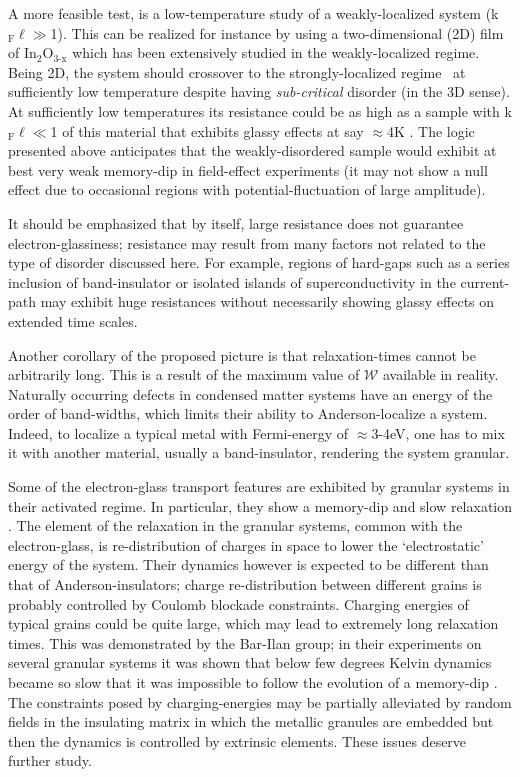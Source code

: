 \documentclass
[preprint,showpacs,byrevtex,10pt,twocolumn,tightenlines,prl,letterpaper]{revtex4}%
\begin{document}
A more feasible test, is a low-temperature study of a weakly-localized system
(k$_{\text{F}}\ell\gg$1). This can be realized for instance by using a
two-dimensional (2D) film of In$_{\text{2}}$O$_{\text{3-x}}$ which has been
extensively studied in the weakly-localized regime. Being 2D, the system
should crossover to the strongly-localized regime \cite{61}\ at sufficiently
low temperature despite having\textit{ sub-critical }disorder (in the 3D
sense). At sufficiently low temperatures its resistance could be as high as a
sample with k$_{\text{F}}\ell\ll$1 of this material that exhibits glassy
effects at say $\approx$4K \cite{15,22,27}. The logic presented above
anticipates that the weakly-disordered sample would exhibit at best very weak
memory-dip in field-effect experiments (it may not show a null effect due to
occasional regions with potential-fluctuation of large amplitude).

It should be emphasized that by itself, large resistance does not guarantee
electron-glassiness; resistance may result from many factors not related to
the type of disorder discussed here. For example, regions of hard-gaps such as
a series inclusion of band-insulator or isolated islands of superconductivity
in the current-path \cite{24} may exhibit huge resistances without necessarily
showing glassy effects on extended time scales.

Another corollary of the proposed picture is that relaxation-times cannot be
arbitrarily long. This is a result of the maximum value of $\mathcal{W}$
available in reality. Naturally occurring defects in condensed matter systems
have an energy of the order of band-widths, which limits their ability to
Anderson-localize a system. Indeed, to localize a typical metal with
Fermi-energy of $\approx$3-4eV, one has to mix it with another material,
usually a band-insulator, rendering the system granular.

Some of the electron-glass transport features are exhibited by granular
systems in their activated regime. In particular, they show a memory-dip and
slow relaxation \cite{62}. The element of the relaxation in the granular
systems, common with the electron-glass, is re-distribution of charges in
space to lower the `electrostatic' energy of the system. Their dynamics
however is expected to be different than that of Anderson-insulators; charge
re-distribution between different grains is probably controlled by Coulomb
blockade constraints. Charging energies of typical grains could be quite
large, which may lead to extremely long relaxation times. This was
demonstrated by the Bar-Ilan group; in their experiments on several granular
systems it was shown that below few degrees Kelvin dynamics became so slow
that it was impossible to follow the evolution of a memory-dip \cite{63}. The
constraints posed by charging-energies may be partially alleviated by random
fields in the insulating matrix in which the metallic granules are embedded
but then the dynamics is controlled by extrinsic elements. These issues
deserve further study.
\end{document}
